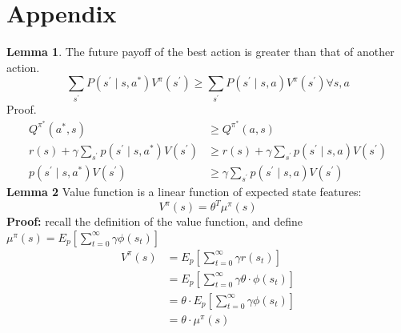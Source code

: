 \documentclass[11pt]{article}
\begin{document}
\section{Appendix}
\textbf{Lemma 1}. The future payoff of the best action is greater than that of another action.
$$
\sum_{s^{\prime}} P\left(s^{\prime} \mid s, a^{*}\right) V^{\pi}\left(s^{\prime}\right) \geq \sum_{s^{\prime}} P\left(s^{\prime} \mid s, a\right) V^{\pi}\left(s^{\prime}\right) \forall s, a
$$
Proof.
$$
\begin{aligned}
Q^{\pi^{*}}\left(a^{*}, s\right) & \geq Q^{\pi^{*}}(a, s) \\
r(s)+\gamma \sum_{s^{\prime}} p\left(s^{\prime} \mid s, a^{*}\right) V\left(s^{\prime}\right) & \geq r(s)+\gamma \sum_{s^{\prime}} p\left(s^{\prime} \mid s, a\right) V\left(s^{\prime}\right) \\
p\left(s^{\prime} \mid s, a^{*}\right) V\left(s^{\prime}\right) & \geq \gamma \sum_{s^{\prime}} p\left(s^{\prime} \mid s, a\right) V\left(s^{\prime}\right)
\end{aligned}
$$
\textbf{Lemma 2} Value function is a linear function of expected state features:
$$
V^{\pi}(s)=\theta^{T} \mu^{\pi}(s)
$$
\textbf{Proof:} recall the definition of the value function, and define $\mu^{\pi}(s)=E_{p}\left[\sum_{t=0}^{\infty} \gamma \phi\left(s_{t}\right)\right]$
$$
\begin{aligned}
V^{\pi}(s) &=E_{p}\left[\sum_{t=0}^{\infty} \gamma r\left(s_{t}\right)\right] \\
&=E_{p}\left[\sum_{t=0}^{\infty} \gamma \theta \cdot \phi\left(s_{t}\right)\right] \\
&=\theta \cdot E_{p}\left[\sum_{t=0}^{\infty} \gamma \phi\left(s_{t}\right)\right] \\
&=\theta \cdot \mu^{\pi}(s)
\end{aligned}
$$
\end{document}
